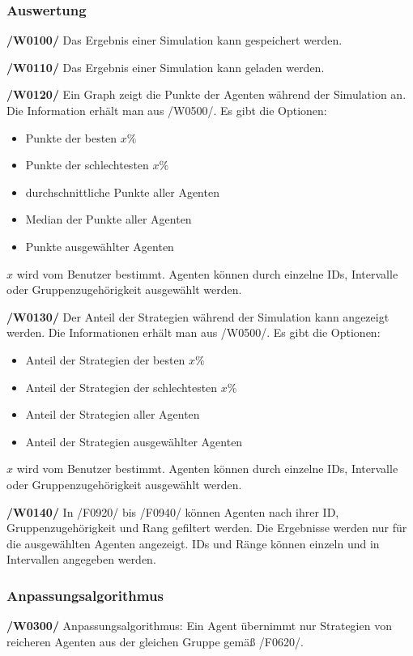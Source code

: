 \subsubsection{Auswertung}

\textbf{/W0100/}
Das Ergebnis einer Simulation kann gespeichert werden.

\textbf{/W0110/}
Das Ergebnis einer Simulation kann geladen werden.

\textbf{/W0120/}
Ein Graph zeigt die Punkte der Agenten während der Simulation an. Die Information erhält man aus /W0500/. Es gibt die Optionen:
\begin{itemize}
\item Punkte der besten $x\%$
\item Punkte der schlechtesten $x\%$
\item durchschnittliche Punkte aller Agenten
\item Median der Punkte aller Agenten
\item Punkte ausgewählter Agenten
\end{itemize}
$x$ wird vom Benutzer bestimmt. Agenten können durch einzelne IDs, Intervalle oder Gruppenzugehörigkeit ausgewählt werden. 

\textbf{/W0130/}
Der Anteil der Strategien während der Simulation kann angezeigt werden. Die Informationen erhält man aus /W0500/. Es gibt die Optionen:
\begin{itemize}
\item Anteil der Strategien der besten $x\%$
\item Anteil der Strategien der schlechtesten $x\%$
\item Anteil der Strategien aller Agenten
\item Anteil der Strategien ausgewählter Agenten
\end{itemize}
$x$ wird vom Benutzer bestimmt. Agenten können durch einzelne IDs, Intervalle  oder Gruppenzugehörigkeit ausgewählt werden. 

\textbf{/W0140/}
In /F0920/ bis /F0940/ können Agenten nach ihrer ID, Gruppenzugehörigkeit und Rang gefiltert werden. Die Ergebnisse werden nur für die ausgewählten Agenten angezeigt. IDs und Ränge können einzeln und in Intervallen angegeben werden.

\subsubsection{Anpassungsalgorithmus}

\textbf{/W0300/}
Anpassungsalgorithmus: Ein Agent übernimmt nur Strategien von reicheren Agenten aus der gleichen Gruppe gemäß /F0620/.

